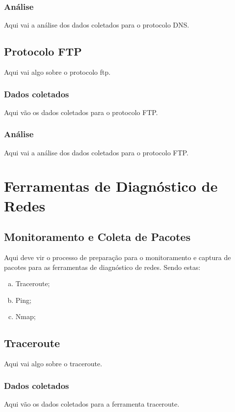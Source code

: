 \documentclass[a4paper]{report} %
\begin{document}
\subsection{Análise}
\label{sub_dns_analise}
Aqui vai a análise dos dados coletados para o protocolo DNS.

\section{Protocolo FTP}
\label{sec_ftp}
Aqui vai algo sobre o protocolo ftp.
\subsection{Dados coletados}
\label{sub_ftp_dados}
Aqui vão os dados coletados para o protocolo FTP.

\subsection{Análise}
\label{sub_ftp_analise}
Aqui vai a análise dos dados coletados para o protocolo FTP.

\chapter{Ferramentas de Diagnóstico de Redes}
\label{chap_segundo}

\section{Monitoramento e Coleta de Pacotes}
\label{sec_segundo_monitoramento}

Aqui deve vir o processo de preparação para o monitoramento e captura de pacotes para as ferramentas de 
diagnóstico de redes. Sendo estas:  
\begin{enumerate}[a)]
 \item Traceroute;
 \item Ping;
 \item Nmap;
\end{enumerate}

\section{Traceroute}
\label{sec_traceroute}
Aqui vai algo sobre o traceroute.
\subsection{Dados coletados}
\label{sub_traceroute_dados}
Aqui vão os dados coletados para a ferramenta traceroute.
\end{document}
